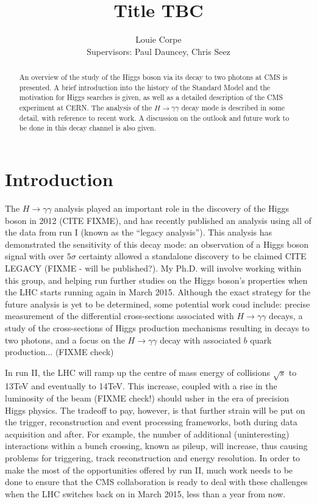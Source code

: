 \documentclass[10pt]{article}
\title{Title TBC}
\author{Louie Corpe \\Supervisors: Paul Dauncey, Chris Seez }
\begin{document}
\maketitle

\renewcommand{\abstractname}{Abstract}
\begin{abstract}
{
An overview of the study of the Higgs boson via its decay to two photons at CMS is presented. A brief introduction into the history of the Standard Model and the motivation for Higgs searches is given, as well as a detailed description of the CMS experiment at CERN. The analysis of the $H \rightarrow \gamma\gamma$ decay mode is described in some detail, with reference to recent work. A discussion on the outlook and future work to be done in this decay channel is also given.}
\end{abstract}



\tableofcontents

\newpage 
\section{Introduction}

The $H \rightarrow \gamma \gamma$ analysis played an important role in the discovery of the Higgs boson in 2012 (CITE FIXME), and has recently published an analysis using all of the data from run I (known as the ``legacy analysis''). This analysis has demonstrated the sensitivity of this decay mode: an observation of a Higgs boson signal with over $5 \sigma$ certainty allowed a standalone discovery to be claimed CITE LEGACY (FIXME - will be published?). My Ph.D. will involve working within this group, and helping run further studies on the Higgs boson's properties when the LHC starts running again in March 2015. Although the exact strategy for the future analysis is yet to be determined, some potential work coud include: precise measurement of the differential cross-sections associated with $H \rightarrow \gamma \gamma$ decays, a study of the cross-sections of Higgs production mechanisms resulting in decays to two photons, and a focus on the $H \rightarrow \gamma \gamma$ decay with associated $b$ quark production... (FIXME check)

In run II, the LHC will ramp up the centre of mass energy of collisions $\sqrt{s}$ to 13TeV and eventually to 14TeV. This increase, coupled with a rise in the luminosity of the beam (FIXME check!) should usher in the era of precision Higgs physics. The tradeoff to pay, however, is that further strain will be put on the trigger, reconstruction and event processing frameworks, both during data acquisition and after. For example, the number of additional (uninteresting) interactions within a bunch crossing, known as pileup, will increase, thus causing problems for triggering, track reconstruction and energy resolution. In order to make the most of the opportunities offered by run II, much work needs to be done to ensure that the CMS collaboration is ready to deal with these challenges when the LHC switches back on in March 2015, less than a year from now.
\end{document}
